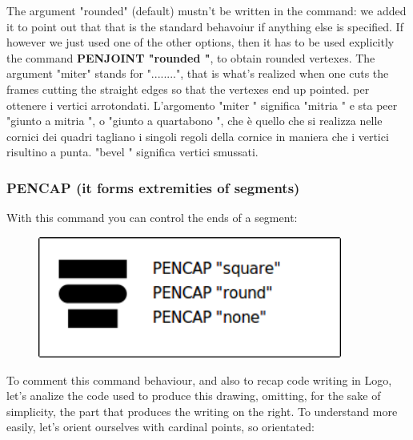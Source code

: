 \vskip 1cm

The argument "rounded" (default) mustn't be written in the command: we added it to point out that that is the standard behavoiur if anything else is specified. If however we just used one of the other options, then it has to be used explicitly the command \textbf{PENJOINT  "rounded "}, to obtain rounded vertexes. The argument "miter" stands for "........", that is what's realized when one cuts the frames cutting the straight edges so that the vertexes end up pointed.
per ottenere i vertici arrotondati. L'argomento  "miter " significa  "mitria " e sta peer  "giunto a mitria ", o  "giunto a quartabono ", che è quello che si realizza nelle cornici dei quadri tagliano i singoli regoli della cornice in maniera che i vertici risultino a punta.  "bevel " significa vertici smussati.

\subsubsection{PENCAP (it forms extremities of segments)}

With this command you can control the ends of a segment:

\vskip 1cm

\begin{figure}[H]
   \centering
   \includegraphics[width=10.0cm,trim=8 8 8 8,clip]{./images/disegnare/disegnare-36.png}
   \label{dis-36}
\end{figure}

\vskip 1cm

To comment this command behaviour, and also to recap code writing in Logo, let's analize the code used to produce this drawing, omitting, for the sake of simplicity, the part that produces the writing on the right. To understand more easily, let's orient ourselves with cardinal points, so orientated:

\vskip 1cm

